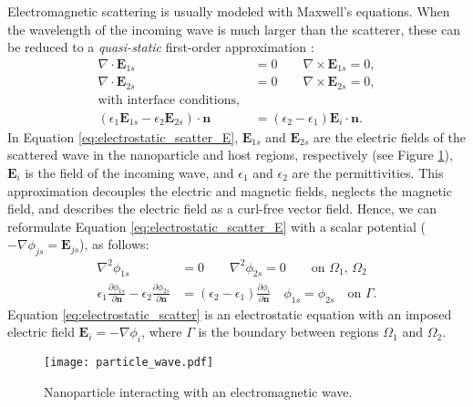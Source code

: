 Electromagnetic scattering is usually modeled with Maxwell's equations.
When the wavelength of the incoming wave is much larger than the
scatterer, these can be reduced to a \emph{quasi-static} 
first-order approximation \cite{MayergoyzZhang2007}:
%
\begin{align} \label{eq:electrostatic_scatter_E}
\nabla \cdot \mathbf{E}_{1s} &= 0 \qquad \nabla \times \mathbf{E}_{1s} = 0, \nonumber \\
\nabla \cdot \mathbf{E}_{2s} &= 0 \qquad \nabla \times \mathbf{E}_{2s} = 0, \nonumber \\
\text{with interface conditions, } \nonumber \\
(\epsilon_1\mathbf{E}_{1s} - \epsilon_2\mathbf{E}_{2s})\cdot\mathbf{n} &= (\epsilon_2-\epsilon_1)\mathbf{E}_i\cdot \mathbf{n}.
\end{align}
%
In Equation \eqref{eq:electrostatic_scatter_E}, $\mathbf{E}_{1s}$ and $\mathbf{E}_{2s}$ 
are the electric fields of the scattered wave in the nanoparticle and host regions, respectively 
(see Figure \ref{fig:part_wave}), 
$\mathbf{E}_{i}$ is the field of the incoming wave, and $\epsilon_1$ 
and $\epsilon_2$ are the permittivities.
This approximation decouples the electric and magnetic fields, neglects the magnetic field, 
and describes the electric field as a curl-free vector field.
Hence, we can reformulate Equation \eqref{eq:electrostatic_scatter_E} with a scalar potential
($-\nabla \phi_{js} = \mathbf{E}_{js}$), as follows:
%
\begin{align} \label{eq:electrostatic_scatter}
\nabla^2 \phi_{1s} &= 0 \qquad \nabla^2 \phi_{2s} = 0 \qquad\text{on $\Omega_1$, $\Omega_2$} \nonumber \\
\epsilon_1\frac{\partial\phi_{1s}}{\partial \mathbf{n}} - \epsilon_2\frac{\partial\phi_{2s}}{\partial\mathbf{n}} &= (\epsilon_2-\epsilon_1)\frac{\partial\phi_i}{\partial\mathbf{n}} \quad \phi_{1s} = \phi_{2s} \quad \text{on $\Gamma$}.
\end{align}
%
Equation \eqref{eq:electrostatic_scatter} is an electrostatic equation 
with an imposed electric field $\mathbf{E}_i=-\nabla\phi_i$, where $\Gamma$ 
is the boundary between regions $\Omega_1$ and $\Omega_2$.

\begin{figure}%
   \centering
   \texttt{[image: particle\_wave.pdf]} 
   \caption{Nanoparticle interacting with an electromagnetic wave.}
   \label{fig:part_wave}
\end{figure}

